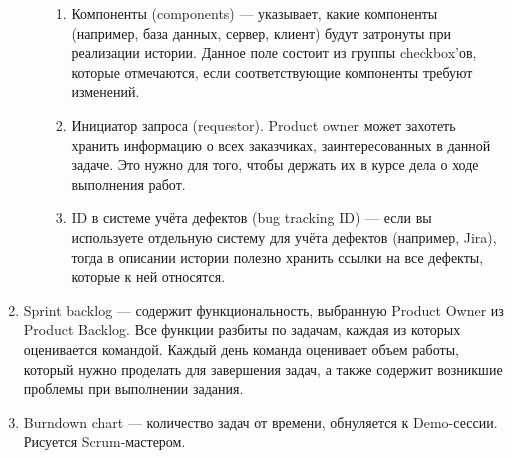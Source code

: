 \documentclass{article}
\begin{document}
\begin{enumerate}
\begin{itemize}
\begin{enumerate}
                \item Компоненты (components) — указывает, какие компоненты (например, база данных, сервер, клиент) будут затронуты при реализации истории. Данное поле состоит из группы checkbox’ов, которые отмечаются, если соответствующие компоненты требуют изменений.
                \item Инициатор запроса (requestor). Product owner может захотеть хранить информацию о всех заказчиках, заинтересованных в данной задаче. Это нужно для того, чтобы держать их в курсе дела о ходе выполнения работ.
                \item ID в системе учёта дефектов (bug tracking ID) — если вы используете отдельную систему для учёта дефектов (например, Jira), тогда в описании истории полезно хранить ссылки на все дефекты, которые к ней относятся.
            \end{enumerate}
        \end{itemize}
        \item Sprint backlog — содержит функциональность, выбранную Product Owner из Product Backlog. Все функции разбиты по задачам, каждая из которых оценивается командой. Каждый день команда оценивает объем работы, который нужно проделать для завершения задач, а также содержит возникшие проблемы при выполнении задания.
        \item Burndown chart — количество задач от времени, обнуляется к Demo-сессии. Рисуется Scrum-мастером.
    \end{enumerate}
\end{document}
